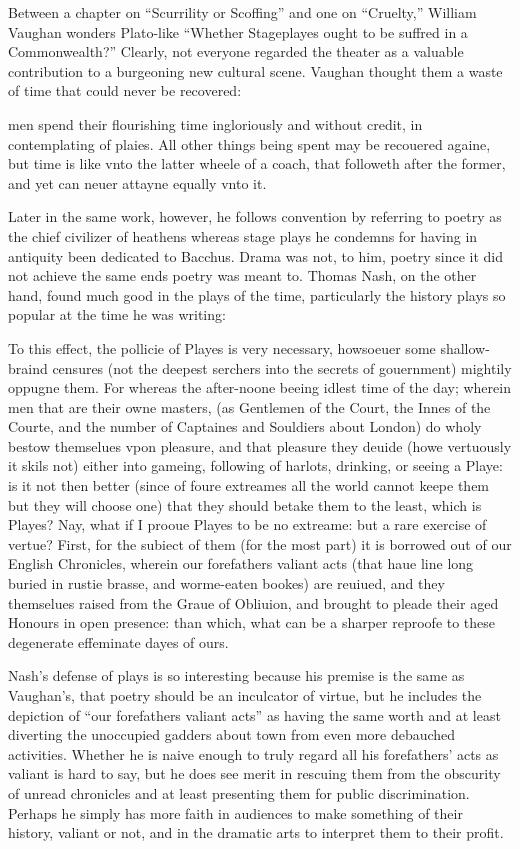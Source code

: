 Between a chapter on ``Scurrility or Scoffing'' and one on ``Cruelty,'' William Vaughan wonders Plato-like ``Whether Stageplayes ought to be suffred in a Commonwealth?'' Clearly, not everyone regarded the theater as a valuable contribution to a burgeoning new cultural scene. Vaughan thought them a waste of time that could never be recovered:
\begin{bq}
men spend their flourishing time ingloriously and without credit, in contemplating of plaies. All other things being spent may be recouered againe, but time is like vnto the latter wheele of a coach, that followeth after the former, and yet can neuer attayne equally vnto it.~\cite[N. pag. Book 1, Ch. 51]{vaughan_golden-groue_1600}
\end{bq}
Later in the same work, however, he follows convention by referring to poetry as the chief civilizer of heathens whereas stage plays he condemns for having in antiquity been dedicated to Bacchus. Drama was not, to him, poetry since it did not achieve the same ends poetry was meant to. Thomas Nash, on the other hand, found much good in the plays of the time, particularly the history plays so popular at the time he was writing:
\begin{bq}
To this effect, the pollicie of Playes is very necessary, howsoeuer some shallow-braind censures (not the deepest serchers into the secrets of gouernment) mightily oppugne them. For whereas the after-noone beeing idlest time of the day; wherein men that are their owne masters, (as Gentlemen of the Court, the Innes of the Courte, and the number of Captaines and Souldiers about London) do wholy bestow themselues vpon pleasure, and that pleasure they deuide (howe vertuously it skils not) either into gameing, following of harlots, drinking, or seeing a Playe: is it not then better (since of foure extreames all the world cannot keepe them but they will choose one) that they should betake them to the least, which is Playes? Nay, what if I prooue Playes to be no extreame: but a rare exercise of vertue? First, for the subiect of them (for the most part) it is borrowed out of our English Chronicles, wherein our forefathers valiant acts (that haue line long buried in rustie brasse, and worme-eaten bookes) are reuiued, and they themselues raised from the Graue of Obliuion, and brought to pleade their aged Honours in open presence: than which, what can be a sharper reproofe to these degenerate effeminate dayes of ours.~\cite[N. pag.]{nash_pierce_1592}
\end{bq}
Nash's defense of plays is so interesting because his premise is the same as Vaughan's, that poetry should be an inculcator of virtue, but he includes the depiction of ``our forefathers valiant acts'' as having the same worth and at least diverting the unoccupied gadders about town from even more debauched activities. Whether he is naive enough to truly regard all his forefathers' acts as valiant is hard to say, but he does see merit in rescuing them from the obscurity of unread chronicles and at least presenting them for public discrimination. Perhaps he simply has more faith in audiences to make something of their history, valiant or not, and in the dramatic arts to interpret them to their profit.

